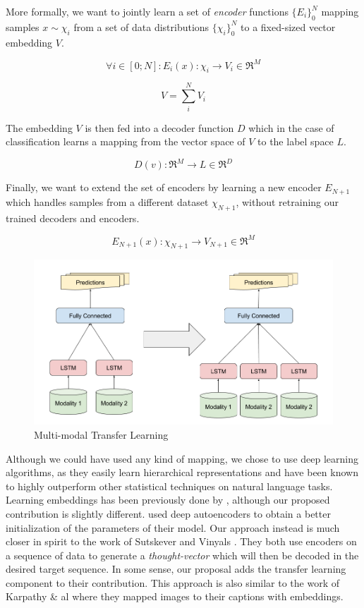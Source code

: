 \documentclass[12pt]{article}
\begin{document}
More formally, we want to jointly learn a set of \emph{encoder}
functions $\{E_i\}_0^N$ mapping samples $x \sim \chi_i$ from a set of
data distributions $\{\chi_i\}_0^N$ to a fixed-sized vector embedding
$V$.

\[ \forall i \in [0; N]: E_i(x): \chi_i \rightarrow V_i \in \Re^M\]

\[V = \sum_i^N V_i\]

The embedding $V$ is then fed into a decoder function $D$ which in the
case of classification learns a mapping from the vector space of $V$ to
the label space $L$.

\[ D(v): \Re^M \rightarrow L \in \Re^D\]

Finally, we want to extend the set of encoders by learning a new encoder
$E_{N+1}$ which handles samples from a different dataset $\chi_{N+1}$,
without retraining our trained decoders and encoders.

\[ E_{N+1}(x): \chi_{N+1} \rightarrow V_{N+1} \in \Re^M\]

\begin{figure}[htbp]
\centering
\includegraphics{figures/multimodal.png}
\caption{Multi-modal Transfer Learning}
\end{figure}

Although we could have used any kind of mapping, we chose to use deep
learning algorithms, as they easily learn hierarchical representations
and have been known to highly outperform other statistical techniques on
natural language tasks. Learning embeddings has been previously done by
\cite{zhuang2015supervised}, although our proposed contribution is
slightly different. \cite{zhuang2015supervised} used deep autoencoders to
obtain a better initialization of the parameters of their model. Our
approach instead is much closer in spirit to the work of Sutskever
\cite{sutskever2014sequence} and Vinyals \cite{vinyals2015grammar}. They
both use encoders on a sequence of data to generate a
\emph{thought-vector} which will then be decoded in the desired target
sequence. In some sense, our proposal adds the transfer learning
component to their contribution. This approach is also similar to the
work of Karpathy \& al \cite{karpathy2014deep} where they mapped
images to their captions with embeddings.
\end{document}

